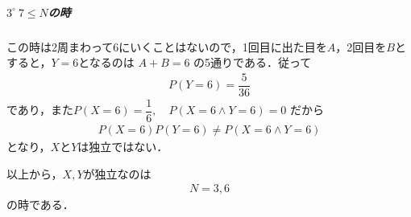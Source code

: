 \documentclass[../../main.tex]{subfiles}
\begin{document}
\subparagraph{$3^{\circ} \ 7 \le N$の時}

この時は2周まわって6にいくことはないので，1回目に出た目を$A$，2回目を$B$とすると，$Y=6$となるのは $A+B=6$ の5通りである．従って
\begin{align}
  P(Y=6) = \dfrac{5}{36}
\end{align}
であり，また$P(X=6)=\dfrac{1}{6}, \quad P(X=6 \land Y=6)=0$ だから
\begin{align}
  P(X=6)P(Y=6) \neq P(X=6 \land Y=6)
\end{align}
となり，$X$と$Y$は独立ではない．
\casesend

以上から，$X, Y$が独立なのは
\begin{align}
  N=3, 6
\end{align}
の時である．
\end{document}
